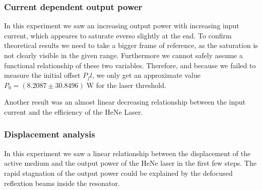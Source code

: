 \documentclass[../main.tex]{subfiles}
\begin{document}
    \subsubsection*{Current dependent output power}
        In this experiment we saw an increasing output power with increasing input current, which appeares to saturate everso slightly at the end. To confirm theoretical results we need to take a bigger frame of reference, as the saturation is not clearly visible in the given range. Furthermore we cannot safely assume a functional relationship of these two variables. Therefore, and because we failed to measure the initial offset $P_fl$, we only get an approximate value $P_0 = (8.2087\pm 30.8496)\;\si{\W}$ for the laser threshold.

        Another result was an almost linear decreasing relationship between the input current and the efficiency of the HeNe Laser. 

    \subsubsection*{Displacement analysis}
        In this experiment we saw a linear relationship between the displacement of the active medium and the output power of the HeNe laser in the first few steps. The rapid stagnation of the output power could be explained by the defocused reflextion beams inside the resonator. 
\end{document}
